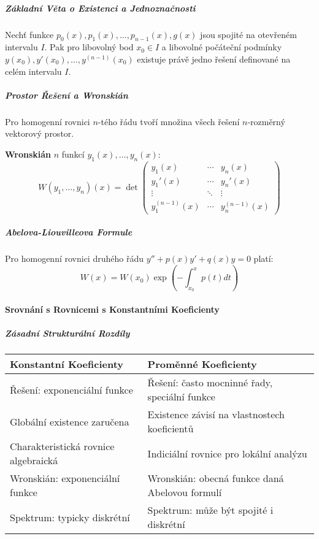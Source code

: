 \subparagraph*{Základní Věta o Existenci a Jednoznačnosti}
\begin{theorem}
Nechť funkce $p_0(x), p_1(x), \dots, p_{n-1}(x), g(x)$ jsou spojité na otevřeném intervalu $I$. Pak pro libovolný bod $x_0 \in I$ a libovolné počáteční podmínky $y(x_0), y'(x_0), \dots, y^{(n-1)}(x_0)$ existuje právě jedno řešení definované na celém intervalu $I$.
\end{theorem}

\subparagraph*{Prostor Řešení a Wronskián}
Pro homogenní rovnici $n$-tého řádu tvoří množina všech řešení $n$-rozměrný vektorový prostor.

\vspace{1\baselineskip}

\noindent\textbf{Wronskián} $n$ funkcí $y_1(x), \dots, y_n(x)$:
\[
W(y_1, \dots, y_n)(x) = \det\begin{pmatrix}
y_1(x) & \cdots & y_n(x) \\
y_1'(x) & \cdots & y_n'(x) \\
\vdots & \ddots & \vdots \\
y_1^{(n-1)}(x) & \cdots & y_n^{(n-1)}(x)
\end{pmatrix}
\]

\subparagraph*{Abelova-Liouvilleova Formule}
Pro homogenní rovnici druhého řádu $y'' + p(x)y' + q(x)y = 0$ platí:
\[
W(x) = W(x_0) \exp\left(-\int_{x_0}^x p(t) dt\right)
\]

\paragraph*{Srovnání s Rovnicemi s Konstantními Koeficienty}

\subparagraph*{Zásadní Strukturální Rozdíly}
\begin{table}[h]
\centering
\begin{tabular}{p{}p{}}
\textbf{Konstantní Koeficienty} & \textbf{Proměnné Koeficienty} \\
\midrule
Řešení: exponenciální funkce & Řešení: často mocninné řady, speciální funkce \\
Globální existence zaručena & Existence závisí na vlastnostech koeficientů \\
Charakteristická rovnice algebraická & Indiciální rovnice pro lokální analýzu \\
Wronskián: exponenciální funkce & Wronskián: obecná funkce daná Abelovou formulí \\
Spektrum: typicky diskrétní & Spektrum: může být spojité i diskrétní \\
\end{tabular}
\end{table}

